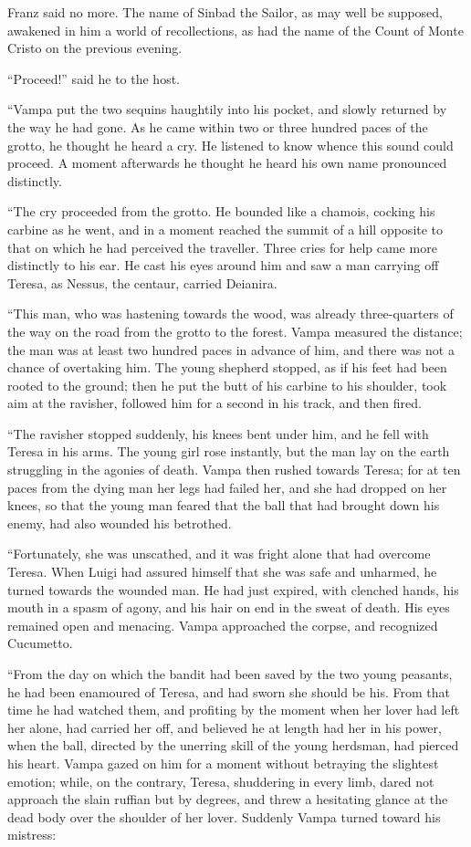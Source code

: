 Franz said no more. The name of Sinbad the Sailor, as may well be
supposed, awakened in him a world of recollections, as had the name of
the Count of Monte Cristo on the previous evening.

“Proceed!” said he to the host.

“Vampa put the two sequins haughtily into his pocket, and slowly
returned by the way he had gone. As he came within two or three hundred
paces of the grotto, he thought he heard a cry. He listened to know
whence this sound could proceed. A moment afterwards he thought he
heard his own name pronounced distinctly.

“The cry proceeded from the grotto. He bounded like a chamois, cocking
his carbine as he went, and in a moment reached the summit of a hill
opposite to that on which he had perceived the traveller. Three cries
for help came more distinctly to his ear. He cast his eyes around him
and saw a man carrying off Teresa, as Nessus, the centaur, carried
Deianira.

“This man, who was hastening towards the wood, was already
three-quarters of the way on the road from the grotto to the forest.
Vampa measured the distance; the man was at least two hundred paces in
advance of him, and there was not a chance of overtaking him. The young
shepherd stopped, as if his feet had been rooted to the ground; then he
put the butt of his carbine to his shoulder, took aim at the ravisher,
followed him for a second in his track, and then fired.

“The ravisher stopped suddenly, his knees bent under him, and he fell
with Teresa in his arms. The young girl rose instantly, but the man lay
on the earth struggling in the agonies of death. Vampa then rushed
towards Teresa; for at ten paces from the dying man her legs had failed
her, and she had dropped on her knees, so that the young man feared
that the ball that had brought down his enemy, had also wounded his
betrothed.

“Fortunately, she was unscathed, and it was fright alone that had
overcome Teresa. When Luigi had assured himself that she was safe and
unharmed, he turned towards the wounded man. He had just expired, with
clenched hands, his mouth in a spasm of agony, and his hair on end in
the sweat of death. His eyes remained open and menacing. Vampa
approached the corpse, and recognized Cucumetto.

“From the day on which the bandit had been saved by the two young
peasants, he had been enamoured of Teresa, and had sworn she should be
his. From that time he had watched them, and profiting by the moment
when her lover had left her alone, had carried her off, and believed he
at length had her in his power, when the ball, directed by the unerring
skill of the young herdsman, had pierced his heart. Vampa gazed on him
for a moment without betraying the slightest emotion; while, on the
contrary, Teresa, shuddering in every limb, dared not approach the
slain ruffian but by degrees, and threw a hesitating glance at the dead
body over the shoulder of her lover. Suddenly Vampa turned toward his
mistress:

